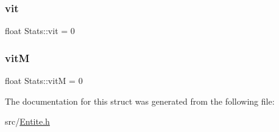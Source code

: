 \mbox{\label{struct_stats_a634d20f3319d16f84d5dd046f4172f41}} 
\subsubsection{\texorpdfstring{vit}{vit}}
{\footnotesize\ttfamily float Stats\+::vit = 0}

\mbox{\label{struct_stats_af120203659d012f02f8caa0e803a705f}} 
\subsubsection{\texorpdfstring{vitM}{vitM}}
{\footnotesize\ttfamily float Stats\+::vitM = 0}



The documentation for this struct was generated from the following file\+:\begin{DoxyCompactItemize}
\item 
src/\mbox{\hyperlink{_entite_8h}{Entite.\+h}}\end{DoxyCompactItemize}
